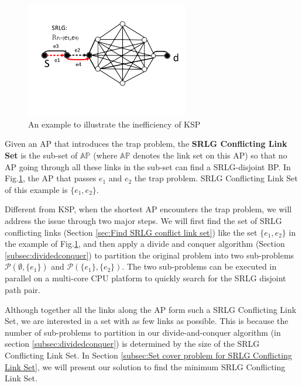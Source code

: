 \begin{figure}[!h]
\centering
\includegraphics[width=2.8in]{franz/KSPproblem}
  \caption{An example to illustrate the inefficiency of KSP}
  \label{fig:KSPproblem}
\end{figure}

Given an AP that introduces the trap problem, the \textbf{SRLG Conflicting Link Set} is the sub-set of $\mathbb{AP}$ (where $\mathbb{AP}$ denotes the link set on this AP) so that no AP going through all these links in the sub-set can find a SRLG-disjoint BP. In Fig.\ref{fig:KSPproblem}, the AP that passes $e_1$ and $e_2$  the trap problem.  SRLG Conflicting Link Set of this example is $\{e_1, e_2\}$.



Different from KSP,  when the shortest AP encounters the trap problem, we will address the issue through two major steps. We will first find the set of SRLG conflicting links  (Section \ref{sec:Find SRLG conflict link set}) like the set  $\{e_1,e_2\}$ in the example of Fig.\ref{fig:KSPproblem}, and then apply a divide and conquer algorithm (Section \ref{subsec:dividedconquer}) to partition the original problem into two sub-problems $\mathcal{P}(\emptyset,\{e_1\})$ and $\mathcal{P}(\{e_1\},\{e_2\})$. The two sub-problems can be executed in parallel on a multi-core CPU platform to quickly search for the SRLG disjoint path pair.

Although together all the links along the AP form such a SRLG Conflicting Link Set, we are interested in a set with as few links as possible. This is because the number of sub-problems to partition in our divide-and-conquer algorithm (in section \ref{subsec:dividedconquer}) is determined by  the size of the SRLG Conflicting Link Set. In Section \ref{subsec:Set cover problem for SRLG Conflicting Link Set}, we will present our solution to find the minimum SRLG Conflicting Link Set.


